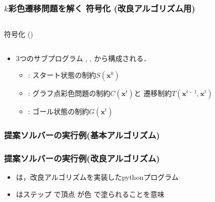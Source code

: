 \documentclass[dvipdfmx,11pt]{beamer}
\begin{document}
\begin{frame}[shrink]
  \frametitle{$k$彩色遷移問題を解く  符号化 {\small(改良アルゴリズム用)}}

\begin{columns}[t]
\begin{column}{0.9\linewidth}
\begin{exampleblock}{ 符号化 ()}
 
\end{exampleblock}    
\end{column}
\end{columns}

\begin{itemize}
\item 3つのサブプログラム
  , , 
  から構成される．
  \begin{itemize}
  \item {} : スタート状態の制約$S(\bm{x}^0)$
  \item {} : グラフ点彩色問題の制約$C(\bm{x}^{t})$と
    遷移制約$T(\bm{x}^{t-1},\bm{x}^{t})$
  \item {} : ゴール状態の制約$G(\bm{x}^{t})$
  \end{itemize}
\end{itemize}
\end{frame}
\begin{frame}[shrink]
  \frametitle{提案ソルバーの実行例{\small (基本アルゴリズム)}}

\begin{exampleblock}{}
 
\end{exampleblock}    
  
\end{frame}
\begin{frame}%
  \frametitle{提案ソルバーの実行例{\small (改良アルゴリズム)}}

  \begin{exampleblock}{}
     
  \end{exampleblock}
  \begin{itemize}
  \item {}は，改良アルゴリズムを実装したpythonプログラム
  \item {}はステップ で頂点 が色
    で塗られることを意味
  \end{itemize}
\end{frame}
\end{document}
